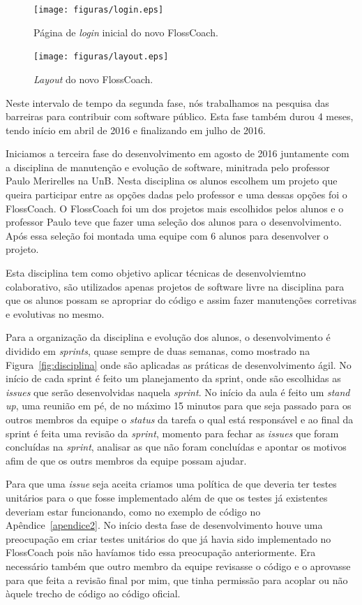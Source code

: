 \begin{figure}[h]
	\centering
	\label{fig:prototipo}
		\texttt{[image: figuras/login.eps]}
	\caption{Página de \textit{login} inicial do novo FlossCoach.}
\end{figure}


\begin{figure}[h]
	\centering
	\label{fig:prototipo}
		\texttt{[image: figuras/layout.eps]}
	\caption{\textit{Layout} do novo FlossCoach.}
\end{figure}


Neste intervalo de tempo da segunda fase, nós trabalhamos na pesquisa das barreiras para
contribuir com software público. Esta fase também durou 4 meses, tendo início em abril 
de 2016 e finalizando em julho de 2016.

Iniciamos a terceira fase do desenvolvimento em agosto de 2016 juntamente com a disciplina 
de manutenção e evolução de software, minitrada pelo professor Paulo Merirelles na UnB. 
Nesta disciplina os alunos escolhem um projeto que queira participar entre as opções 
dadas pelo professor e uma dessas opções foi o FlossCoach. O FlossCoach foi um dos 
projetos mais escolhidos pelos alunos e o professor Paulo teve que fazer uma seleção
dos alunos para o desenvolvimento. Após essa seleção foi montada uma equipe com
6 alunos para desenvolver o projeto.

Esta disciplina tem como objetivo aplicar técnicas de desenvolviemtno colaborativo,
são utilizados apenas projetos de software livre na disciplina para que os alunos 
possam se apropriar do código e assim fazer manutenções corretivas e evolutivas no
mesmo.

Para a organização da disciplina e evolução dos alunos, o desenvolvimento é dividido
em \textit{sprints}, quase sempre de duas semanas, como mostrado na Figura~\ref{fig:disciplina}
onde são aplicadas as práticas de desenvolvimento ágil. No início de cada sprint é feito um planejamento da sprint, 
onde são escolhidas as \textit{issues} que serão desenvolvidas naquela \textit{sprint}.
No início da aula é feito um \textit{stand up}, uma reunião em pé, de no máximo 15
minutos para que seja passado para os outros membros da equipe o \textit{status} da
tarefa o qual está responsável e ao final da sprint é feita uma revisão da \textit{sprint},
momento para fechar as \textit{issues} que foram concluídas na \textit{sprint}, 
analisar as que não foram concluídas e apontar os motivos afim de que os outrs membros
da equipe possam ajudar.

Para que uma \textit{issue} seja aceita criamos uma política de que deveria ter
testes unitários para o que fosse implementado além de que os testes já existentes
deveriam estar funcionando, como no exemplo de código no Apêndice~\ref{apendice2}.
No início desta fase de desenvolvimento houve uma preocupação 
em criar testes unitários do que já havia sido implementado no FlossCoach pois 
não havíamos tido essa preocupação anteriormente. Era necessário também que outro 
membro da equipe revisasse o código e o aprovasse para que feita a revisão final
por mim, que tinha permissão para acoplar ou não àquele trecho de código ao
código oficial. 

